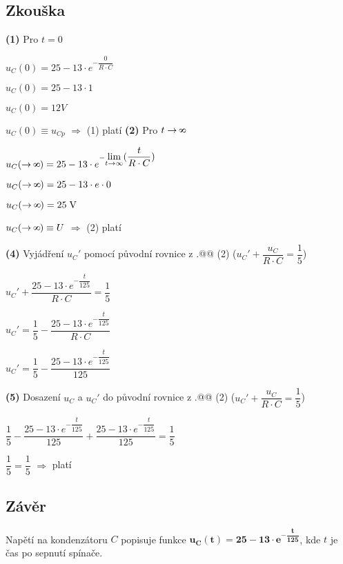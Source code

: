 \documentclass[a4paper,12pt]{article}
\makeatletter
\newcommand*{\rom}[1]{\expandafter\@slowromancap\romannumeral #1@}
\def\infinity{\rotatebox{90}{8}}
\makeatother
\begin{document}
\subsection{Zkouška}
\hspace{1em}\textbf{(1)} Pro $t=0$\par\vspace{0.2em}
$u_C(0)=25-13\cdot e^{-\dfrac{0}{R\cdot C}}$\par
$u_C(0)=25-13\cdot 1$\par
$u_C(0)=12V$\par
$u_C(0)\equiv u_{Cp}$ $\Rightarrow$ (1) platí\newpage
\hspace{1em}\textbf{(2)} Pro $t\rightarrow \infinity$\par\vspace{0.2em}
$u_C(\rightarrow \infinity)=25-13\cdot e^{-\displaystyle{\lim_{t \to \infty}}(\dfrac{t}{R\cdot C})}$\par
$u_C(\rightarrow \infinity)=25-13\cdot e\cdot 0$\par
$u_C(\rightarrow \infinity)=25\;\si{\volt}$\par
$u_C(\rightarrow \infinity)\equiv U$ $\Rightarrow$ (2) platí\par\vspace{1em}
\hspace{1em}\textbf{(4)} Vyjádření $u_C'$ pomocí původní rovnice z \rom{5.}\rom{2} (2) ($u_C'+\dfrac{u_C}{R\cdot C}=\dfrac{1}{5}$)\par\vspace{0.2em}
$u_C'+\dfrac{25-13\cdot e^{-\dfrac{t}{125}}}{R\cdot C}=\dfrac{1}{5}$\par
$u_C'=\dfrac{1}{5}-\dfrac{25-13\cdot e^{-\dfrac{t}{125}}}{R\cdot C}$\par
$u_C'=\dfrac{1}{5}-\dfrac{25-13\cdot e^{-\dfrac{t}{125}}}{125}$\par\vspace{1em}
\hspace{1em}\textbf{(5)} Dosazení $u_C$ a $u_C'$ do původní rovnice z \rom{5.}\rom{2} (2) ($u_C'+\dfrac{u_C}{R\cdot C}=\dfrac{1}{5}$)\par\vspace{0.5em}
$\dfrac{1}{5}-\dfrac{25-13\cdot e^{-\dfrac{t}{125}}}{125}+\dfrac{25-13\cdot e^{-\dfrac{t}{125}}}{125}=\dfrac{1}{5}$\par
$\dfrac{1}{5}=\dfrac{1}{5}$ $\Rightarrow$ platí\par\vspace{1.5em}
\subsection{Závěr}\vspace{-1em}
Napětí na kondenzátoru $C$ popisuje funkce $\mathbf{u_C(t)=25-13\cdot e^{-\dfrac{t}{125}}}$, kde $t$ je čas po sepnutí spínače.\newpage
\end{document}
